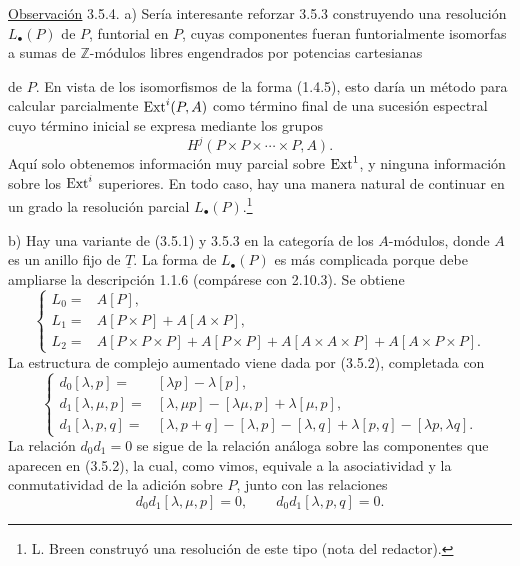 \underline{Observación} 3.5.4. a) Sería interesante reforzar 3.5.3
construyendo una resolución $L_\bullet(P)$ de $P$, funtorial en $P$, cuyas
componentes fueran funtorialmente isomorfas a sumas de
$\mathbb Z$-módulos libres engendrados por potencias cartesianas


de $P$. En vista de los isomorfismos de la forma (1.4.5), esto daría un
método para calcular parcialmente $\operatorname{Ext}^i(P,A)$ como término final de una
sucesión espectral cuyo término inicial se expresa mediante los grupos
\[
 H^j(P\times P\times\cdots\times P,A).
\]
Aquí solo obtenemos información muy parcial sobre $\operatorname{Ext}^1$, y ninguna
información sobre los $\operatorname{Ext}^i$ superiores. En todo caso, hay una manera
natural de continuar en un grado la resolución parcial
$L_\bullet(P)$.\footnote{L. Breen construyó una resolución de este tipo
(nota del redactor).}

b) Hay una variante de (3.5.1) y 3.5.3 en la categoría de los
$A$-módulos, donde $A$ es un anillo fijo de $\underline T$. La forma de
$L_\bullet(P)$ es más complicada porque debe ampliarse la descripción
1.1.6 (compárese con 2.10.3). Se obtiene
\begin{equation}\tag{3.5.5}
\left\{
\begin{aligned}
 L_0={}&A[P],\\
 L_1={}&A[P\times P]+A[A\times P],\\
 L_2={}&A[P\times P\times P]+A[P\times P]
       +A[A\times A\times P]+A[A\times P\times P].
\end{aligned}
\right.
\end{equation}
La estructura de complejo aumentado viene dada por (3.5.2), completada
con
\begin{equation}\tag{3.5.6}
\left\{
\begin{aligned}
 d_0[\lambda,p]={}&[\lambda p]-\lambda[p],\\
 d_1[\lambda,\mu,p]={}&[\lambda,\mu p]-[\lambda\mu,p]
                         +\lambda[\mu,p],\\
 d_1[\lambda,p,q]={}&[\lambda,p+q]-[\lambda,p]-[\lambda,q]
                       +\lambda[p,q]-[\lambda p,\lambda q].
\end{aligned}
\right.
\end{equation}
La relación $d_0d_1=0$ se sigue de la relación análoga sobre las
componentes que aparecen en (3.5.2), la cual, como vimos, equivale a la
asociatividad y la conmutatividad de la adición sobre $P$, junto con las
relaciones
\[
 d_0d_1[\lambda,\mu,p]=0,
 \qquad d_0d_1[\lambda,p,q]=0.
\]

